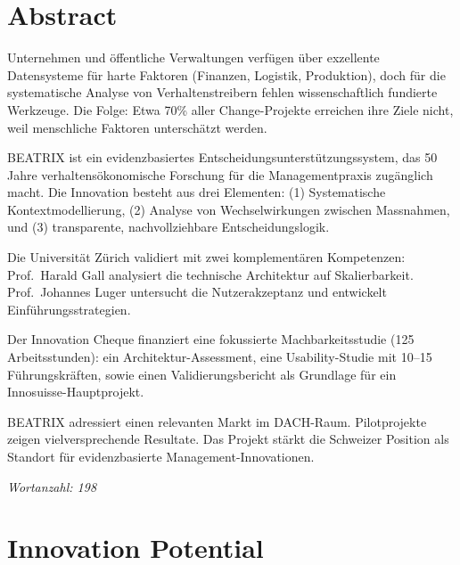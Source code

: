 \documentclass[11pt,a4paper]{article}
\begin{document}
\tableofcontents
\newpage

\section*{Abstract}

Unternehmen und öffentliche Verwaltungen verfügen über exzellente Datensysteme für harte Faktoren (Finanzen, Logistik, Produktion), doch für die systematische Analyse von Verhaltenstreibern fehlen wissenschaftlich fundierte Werkzeuge. Die Folge: Etwa 70\% aller Change-Projekte erreichen ihre Ziele nicht, weil menschliche Faktoren unterschätzt werden.

BEATRIX ist ein evidenzbasiertes Entscheidungsunterstützungssystem, das 50 Jahre verhaltensökonomische Forschung für die Managementpraxis zugänglich macht. Die Innovation besteht aus drei Elementen: (1) Systematische Kontextmodellierung, (2) Analyse von Wechselwirkungen zwischen Massnahmen, und (3) transparente, nachvollziehbare Entscheidungslogik.

Die Universität Zürich validiert mit zwei komplementären Kompetenzen: Prof.~Harald Gall analysiert die technische Architektur auf Skalierbarkeit. Prof.~Johannes Luger untersucht die Nutzerakzeptanz und entwickelt Einführungsstrategien.

Der Innovation Cheque finanziert eine fokussierte Machbarkeitsstudie (125 Arbeitsstunden): ein Architektur-Assessment, eine Usability-Studie mit 10--15 Führungskräften, sowie einen Validierungsbericht als Grundlage für ein Innosuisse-Hauptprojekt.

BEATRIX adressiert einen relevanten Markt im DACH-Raum. Pilotprojekte zeigen vielversprechende Resultate. Das Projekt stärkt die Schweizer Position als Standort für evidenzbasierte Management-Innovationen.

\vspace{0.5cm}
\noindent\textit{Wortanzahl: 198}

\newpage

\section{Innovation Potential}
\end{document}
